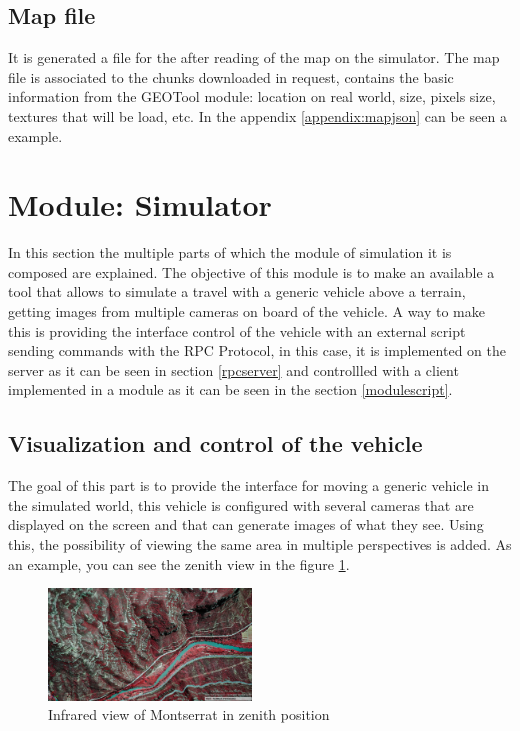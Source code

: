 \documentclass[10pt,a4paper,twocolumn,twoside]{article}
\begin{document}
\subsection{Map file}

It is generated a file for the after reading of the map on the simulator. The map file is associated to the chunks downloaded in request, contains the basic information from the GEOTool module: location on real world, size, pixels size, textures that will be load, etc. In the appendix  \ref{appendix:mapjson}  can be seen a example.

\section{Module: Simulator}

In this section the multiple parts of which the module of simulation it is composed are explained. The objective of this module is to make an available a tool that allows to simulate a travel with a generic vehicle above a terrain, getting images from multiple cameras on board of the vehicle. A way to make this is providing the interface control of the vehicle with an external script sending commands with the RPC Protocol, in this case, it is implemented on the server as it can be seen in section \ref{rpcserver} and controllled with a client implemented in a module as it can be seen in the section \ref{modulescript}.

\subsection{Visualization and control of the vehicle}

The goal of this part is to provide the interface for moving a generic vehicle in the simulated world, this vehicle is configured with several cameras that are displayed on the screen and that can generate images of what they see. Using this, the possibility of viewing the same area in multiple perspectives is added. As an example, you can see the zenith view in the figure \ref{fig-montserratir}.

\begin{figure}[!h]
\centering
  	\includegraphics[width=0.48\textwidth]{cenitalviewir}
	\caption{Infrared view of Montserrat in zenith position}
	\label{fig-montserratir}
\end{figure}
\end{document}

